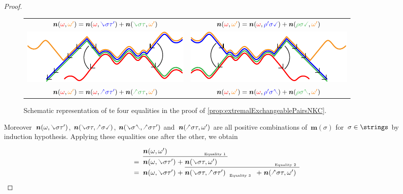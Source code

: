 \documentclass{amsart}
\theoremstyle{definition}
\renewcommand{\b}[1]{{\boldsymbol{#1}}} %
\newcommand{\red}{\color{red}} %
\newcommand{\blue}{\color{blue}} %
\newcommand{\orange}{\color{orange}} %
\newcommand{\green}{\color{green}} %
\newcommand{\hL}{\text{\rotatebox[origin=c]{180}{\checked}}}
\newcommand{\hR}{\text{\rotatebox[origin=c]{180}{\reflectbox{\checked}}}}
\newcommand{\cL}{\text{\reflectbox{\checked}}}
\newcommand{\cR}{\text{\checked}}
\begin{document}
\begin{proof}
\begin{figure}[t]
{\begin{tabular}{c@{\qquad}c}
		$\b{n}({\red \omega}, {\orange \omega'}) = \b{n}({\red \omega}, {\blue \cL \sigma \tau'}) + \b{n}({\green \cL \sigma \tau}, {\orange \omega'})$ & $\b{n}({\red \omega}, {\orange \omega'}) = \b{n}({\red \omega}, {\blue \rho' \sigma \cR}) + \b{n}({\green \rho \sigma \cR}, {\orange \omega'})$ \\[.4cm]
		\includegraphics[scale=1.2]{fourEqualities3} & \includegraphics[scale=1.2]{fourEqualities4} \\
		$\b{n}({\red \omega}, {\orange \omega'}) = \b{n}({\red \omega}, {\blue \hL \sigma \tau'}) + \b{n}({\green \hL \sigma \tau}, {\orange \omega'})$ & $\b{n}({\red \omega}, {\orange \omega'}) = \b{n}({\red \omega}, {\blue \rho' \sigma \hR}) + \b{n}({\green \rho \sigma \hR}, {\orange \omega'})$ \\
	\end{tabular}
	}
	\caption{Schematic representation of te four equalities in the proof of \cref{prop:extremalExchangeablePairsNKC}.}
	\label{fig:fourEqualities}
\end{figure}
%
Moreover~$\b{n}(\omega, \cL \sigma \tau')$, $\b{n}(\cL \sigma \tau, \hL \sigma \cR)$, $\b{n}(\cL \sigma \hR, \hL \sigma \tau')$ and~$\b{n}(\hL \sigma \tau, \omega')$ are all positive combinations of~$\b{m}(\sigma)$ for~$\sigma \in \strings$ by induction hypothesis.
%
Applying these equalities one after the other, we obtain
\[
\renewcommand{\arraystretch}{1.3}
\begin{array}[t]{l@{\;\;}l@{\;}l@{\;}l@{\;}l@{\;}l@{\;}l@{\;}l@{\;}l@{\;}l}
  & \b{n}(\omega, \omega') & & \hfill\raisebox{-.1cm}{\text{\tiny{Equality 1}}} & & & & & & \\
\cline{2-4}
= & \b{n}(\omega, \cL \sigma \tau') & + & \b{n}(\cL \sigma \tau, \omega') & & & & & & \hfill\raisebox{-.1cm}{\text{\tiny{Equality 2}}} \\
\cline{4-10}
= & \b{n}(\omega, \cL \sigma \tau') & + & \b{n}(\cL \sigma \tau, \hL \sigma \tau') & & \hfill\raisebox{-.1cm}{\text{\tiny{Equality 3}}} & & & + & \b{n}(\hL \sigma \tau, \omega') \\

\end{array}\]
\end{proof}
\end{document}
